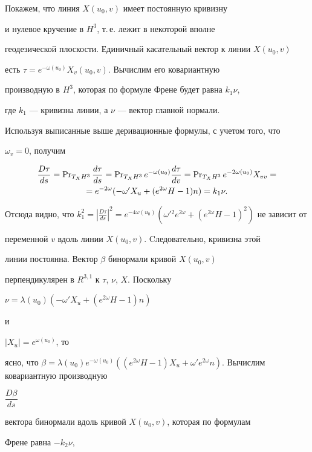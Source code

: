 \begin{pf}


Покажем, что линия $X(u_0,v)$ имеет постоянную кривизну


и нулевое кручение в $H^3$, т.\,е. лежит в некоторой вполне


геодезической плоскости. Единичный касательный вектор к линии $X(u_0,v)$


есть $\tau =e^{-\omega (u_0)}X_v(u_0,v)$. Вычислим его ковариантную


производную в $H^3$, которая по формуле Френе будет равна $k_1\nu$,


где $k_1$ --- кривизна линии, а $\nu$ --- вектор главной нормали.


Используя выписанные выше деривационные формулы, с учетом того, что


$\omega_v=0$, получим


\begin{multline*}


\frac{D\tau}{ds}=\PR_{T_XH^3}\frac{d\tau}{ds}=\PR_{T_XH^3}e^{-\omega(u_0)}


\frac{d\tau}{dv}=\PR_{T_XH^3}e^{-2\omega(u_0)}X_{vv}=\\


=e^{-2\omega}(-\omega 'X_u+(e^{2\omega}H-1)n)=k_1\nu.


\end{multline*}


Отсюда видно, что $k_1^2=|\frac{D\tau}{ds}|^2=e^{-4\omega


(u_0)}(\omega'{}^2 e^{2\omega}+(e^{2\omega}H-1)^2)$ не зависит от


переменной $v$ вдоль линии $X(u_0,v)$. Cледовательно, кривизна этой


линии постоянна. Вектор $\beta $ бинормали кривой $X(u_0,v)$


перпендикулярен в $R^{3,1}$ к $\tau$, $\nu$, $X$. Поскольку


$\nu =\lambda(u_0)(-\omega 'X_u+(e^{2\omega}H-1)n)$


и


$|X_u|=e^{\omega(u_0)}$, то


ясно, что $\beta =\lambda (u_0)e^{-\omega (u_0)}((e^{2\omega}H-1)X_u+


\omega'e^{2\omega}n)$. Вычислим ковариантную производную


$\dfrac{D\beta}{ds}$


вектора бинормали вдоль кривой $X(u_0,v)$, которая по формулам


Френе равна $-k_2\nu $,



\end{pf}
